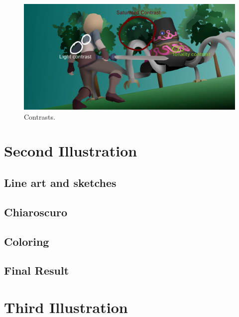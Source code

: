 \documentclass{cup-pan}
\begin{document}
            \begin{figure}[H]
                \includegraphics[width=\textwidth]{Imagenes/Fanart2/Analysis/contraste.png}
                \caption{Contrasts.}
            \end{figure}

\newpage
\newpage
\section{Second Illustration}

    \subsection{Line art and sketches}

    \subsection{Chiaroscuro}

    \subsection{Coloring}

    \subsection{Final Result}
\newpage
\newpage
\section{Third Illustration}
\end{document}
